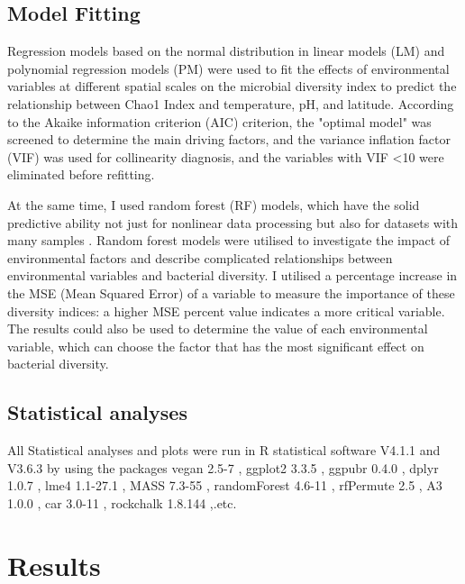 \documentclass[11pt, a4paper]{article}
\begin{document}
\begin{spacing}{1.5}
\subsection{Model Fitting}

Regression models based on the normal distribution in linear models (LM) and polynomial regression models (PM) were used to fit the effects of environmental variables at different spatial scales on the microbial diversity index to predict the relationship between Chao1 Index and temperature, pH, and latitude. According to the Akaike information criterion (AIC) criterion, the "optimal model" was screened to determine the main driving factors, and the variance inflation factor (VIF) was used for collinearity diagnosis, and the variables with VIF \textless 10 were eliminated before refitting. 

At the same time, I used random forest (RF) models, which have the solid predictive ability not just for nonlinear data processing but also for datasets with many samples \citep{breiman2001random, cutler2007random}. Random forest models were utilised to investigate the impact of environmental factors and describe complicated relationships between environmental variables and bacterial diversity. I utilised a percentage increase in the MSE (Mean Squared Error) of a variable to measure the importance of these diversity indices: a higher MSE percent value indicates a more critical variable. The results could also be used to determine the value of each environmental variable, which can choose the factor that has the most significant effect on bacterial diversity.
 

\subsection{Statistical analyses}
All Statistical analyses and plots were run in R statistical software V4.1.1 and V3.6.3 \citep{team2013r} by using the packages vegan 2.5-7 \citep{oksanen2013package}, ggplot2 3.3.5 \citep{wickham2011ggplot2}, ggpubr 0.4.0 \citep{kassambara2020package}, dplyr 1.0.7 \citep{mailund2019manipulating}, lme4 1.1-27.1 \citep{bates2014fitting}, MASS 7.3-55 \citep{ripley2013package}, randomForest 4.6-11 \citep{rcolorbrewer2018package}, rfPermute 2.5 \citep{archer2016package}, A3 1.0.0 \citep{fortmann2015package}, car 3.0-11 \citep{fox2012package}, rockchalk 1.8.144 \citep{johnson2019package},.etc.

\section{Results}


\end{spacing}
\end{document}

